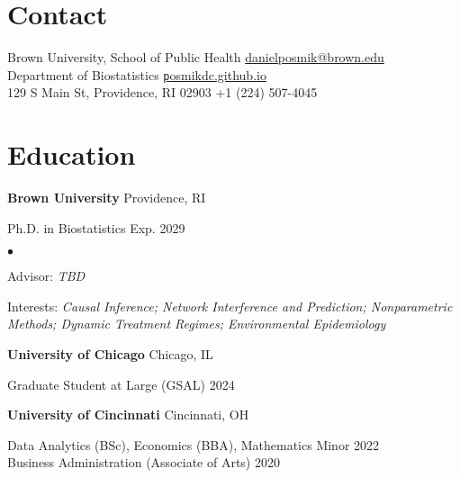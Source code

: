 \documentclass[margin,line, 10pt]{cv}
\newenvironment{list2}{
  \begin{list}{$\bullet$}{%
      \setlength{\itemsep}{0in}
      \setlength{\parsep}{0in} \setlength{\parskip}{0in}
      \setlength{\topsep}{0in} \setlength{\partopsep}{0in} 
      \setlength{\leftmargin}{0.2in}}}{\end{list}}
\begin{document}

\begin{resume}
\section{\sc Contact}
Brown University, School of Public Health \hfill \href{mailto:daniel_posmik@brown.edu}{daniel{\textunderscore}posmik@brown.edu}\\
Department of Biostatistics \hfill \hfill \href{https://posmikdc.github.io}{\texttt posmikdc.github.io}\\
129 S Main St, Providence, RI 02903 \hfill +1 (224) 507-4045 

\section{\sc Education}
{\bf Brown University} \hfill Providence, RI

\vspace{-0.4cm}
Ph.D. in Biostatistics \hfill {Exp. 2029}

\vspace*{.05in}  
\begin{list2}
  \item Advisor: \emph{TBD}
  \item Interests: \emph{Causal Inference; Network Interference and Prediction; Nonparametric Methods; Dynamic Treatment Regimes; Environmental Epidemiology}
\end{list2}

{\bf University of Chicago} \hfill Chicago, IL

\vspace{-0.4cm}
Graduate Student at Large (GSAL) \hfill {2024}

{\bf University of Cincinnati} \hfill Cincinnati, OH 

\vspace{-0.4cm}
Data Analytics (BSc), Economics (BBA), Mathematics Minor \hfill {2022}\\
Business Administration (Associate of Arts) \hfill {2020}


\end{resume}
\end{document}
